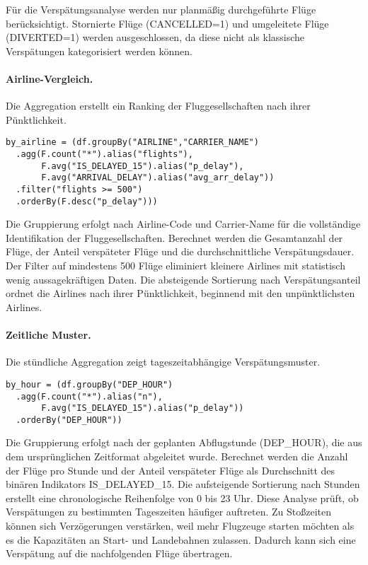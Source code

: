 \documentclass[a4paper,11pt]{article}
\begin{document}
\noindent Für die Verspätungsanalyse werden nur planmäßig durchgeführte Flüge berücksichtigt. Stornierte Flüge (CANCELLED=1) und umgeleitete Flüge (DIVERTED=1) werden ausgeschlossen, da diese nicht als klassische Verspätungen kategorisiert werden können.


\paragraph{Airline-Vergleich.} Die Aggregation erstellt ein Ranking der Fluggesellschaften nach ihrer Pünktlichkeit.

\begin{verbatim}
by_airline = (df.groupBy("AIRLINE","CARRIER_NAME")
  .agg(F.count("*").alias("flights"),
       F.avg("IS_DELAYED_15").alias("p_delay"),
       F.avg("ARRIVAL_DELAY").alias("avg_arr_delay"))
  .filter("flights >= 500")
  .orderBy(F.desc("p_delay")))
\end{verbatim}

Die Gruppierung erfolgt nach Airline-Code und Carrier-Name für die vollständige Identifikation der Fluggesellschaften. Berechnet werden die Gesamtanzahl der Flüge, der Anteil verspäteter Flüge und die durchschnittliche Verspätungsdauer. Der Filter auf mindestens 500 Flüge eliminiert kleinere Airlines mit statistisch wenig aussagekräftigen Daten. Die absteigende Sortierung nach Verspätungsanteil ordnet die Airlines nach ihrer Pünktlichkeit, beginnend mit den unpünktlichsten Airlines.


\paragraph{Zeitliche Muster.} Die stündliche Aggregation zeigt tageszeitabhängige Verspätungsmuster.

\begin{verbatim}
by_hour = (df.groupBy("DEP_HOUR")
  .agg(F.count("*").alias("n"),
       F.avg("IS_DELAYED_15").alias("p_delay"))
  .orderBy("DEP_HOUR"))
\end{verbatim}

Die Gruppierung erfolgt nach der geplanten Abflugstunde (DEP\_HOUR), die aus dem ursprünglichen Zeitformat abgeleitet wurde. Berechnet werden die Anzahl der Flüge pro Stunde und der Anteil verspäteter Flüge als Durchschnitt des binären Indikators IS\_DELAYED\_15. Die aufsteigende Sortierung nach Stunden erstellt eine chronologische Reihenfolge von 0 bis 23 Uhr. Diese Analyse prüft, ob Verspätungen zu bestimmten Tageszeiten häufiger auftreten. Zu Stoßzeiten können sich Verzögerungen verstärken, weil mehr Flugzeuge starten möchten als es die Kapazitäten an Start- und Landebahnen zulassen. Dadurch kann sich eine Verspätung auf die nachfolgenden Flüge übertragen.
\end{document}
